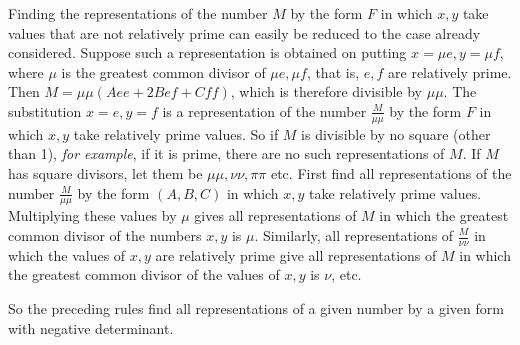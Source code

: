 Finding the representations of the number $M$ by the form $F$ in which $x,y$ take values that are not relatively prime can easily be reduced to the case already considered. Suppose such a representation is obtained on putting $x=\mu e,y=\mu f$, where $\mu$ is the greatest common divisor of $\mu e,\mu f$, that is, $e,f$ are relatively prime. Then $M=\mu\mu(Aee+2Bef+Cff)$, which is therefore divisible by $\mu\mu$. The substitution $x=e,y=f$ is a representation of the number $\frac{M}{\mu\mu}$ by the form $F$ in which $x,y$ take relatively prime values. So if $M$ is divisible by no square (other than 1), \textit{for example}, if it is prime, there are no such representations of $M$. If $M$ has square divisors, let them be $\mu\mu,\nu\nu,\pi\pi$ etc. First find all representations of the number $\frac{M}{\mu\mu}$ by the form $(A,B,C)$ in which $x,y$ take relatively prime values. Multiplying these values by $\mu$ gives all representations of $M$ in which the greatest common divisor of the numbers $x,y$ is $\mu$. Similarly, all representations of $\frac{M}{\nu\nu}$ in which the values of $x,y$ are relatively prime give all representations of $M$ in which the greatest common divisor of the values of $x,y$ is $\nu$, etc.

So the preceding rules find all representations of a given number by a given form with negative determinant.
